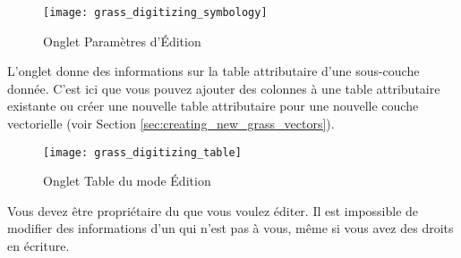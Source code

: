 \begin{figure}[ht]
 \begin{center}
 \texttt{[image: grass\_digitizing\_symbology]}
  \caption{Onglet Paramètres d'Édition \grass \nixcaption}\label{fig:grass_digitizing_settingsTODO}
 \end{center}
\end{figure}

 
L'onglet  donne des informations sur la table attributaire d'une sous-couche donnée. C'est ici que vous pouvez ajouter des colonnes à une table attributaire existante ou créer une nouvelle table attributaire pour une nouvelle couche vectorielle \grass (voir Section \ref{sec:creating_new_grass_vectors}).

\begin{figure}[ht]
 \begin{center}
 \texttt{[image: grass\_digitizing\_table]}
  \caption{Onglet Table du mode Édition \grass \nixcaption}\label{fig:grass_digitizing_table}
 \end{center}
\end{figure}

\begin{Tip}\caption{\textsc{Éditer les permissions \grass}}
Vous devez être propriétaire du  que vous voulez éditer. Il est impossible de modifier des informations d'un  qui n'est pas à vous, même si vous avez des droits en écriture.
\end{Tip} 

